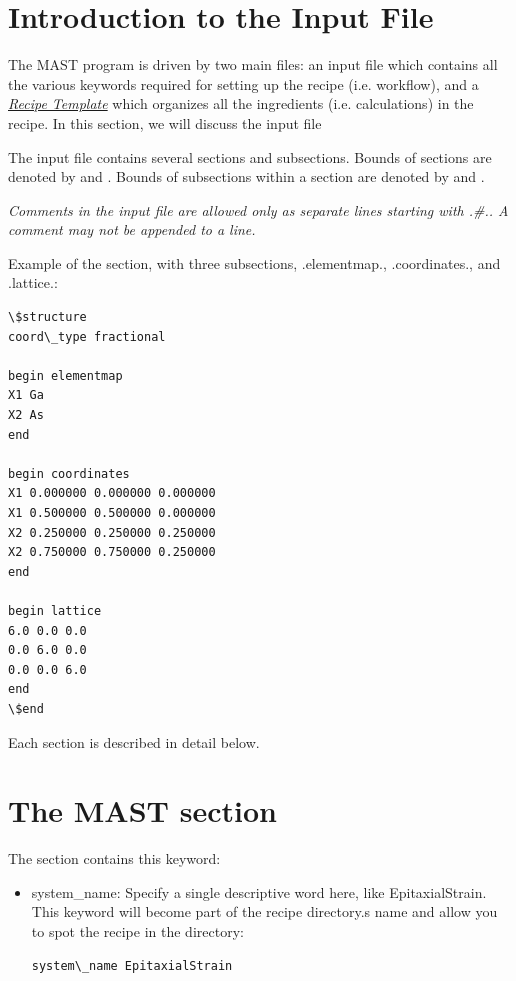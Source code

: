 \documentclass[letterpaper,10pt,english]{sphinxmanual}
\begin{document}
\section{Introduction to the Input File}
\label{3_0_inputfile:introduction-to-the-input-file}
The MAST program is driven by two main files: an input file which contains all the various keywords required for setting up the recipe (i.e. workflow), and a {\hyperref[4_0_recipe::doc]{\emph{Recipe Template}}} which organizes all the ingredients (i.e. calculations) in the recipe. In this section, we will discuss the input file

The input file contains several sections and subsections.
Bounds of sections are denoted by  and .
Bounds of subsections within a section are denoted by  and .

\emph{Comments in the input file are allowed only as separate lines starting with .\#.. A comment may not be appended to a line.}

Example of the  section, with three subsections, .elementmap., .coordinates., and .lattice.:

\begin{Verbatim}[commandchars=\\\{\}]
\$structure
coord\_type fractional

begin elementmap
X1 Ga
X2 As
end

begin coordinates
X1 0.000000 0.000000 0.000000
X1 0.500000 0.500000 0.000000
X2 0.250000 0.250000 0.250000
X2 0.750000 0.750000 0.250000
end

begin lattice
6.0 0.0 0.0
0.0 6.0 0.0
0.0 0.0 6.0
end
\$end
\end{Verbatim}

Each section is described in detail below.


\section{The MAST section}
\label{3_0_inputfile:the-mast-section}
The  section contains this keyword:
\begin{itemize}
\item {} 
system\_name: Specify a single descriptive word here, like EpitaxialStrain. This keyword will become part of the recipe directory.s name and allow you to spot the recipe in the  directory:

\begin{Verbatim}[commandchars=\\\{\}]
system\_name EpitaxialStrain
\end{Verbatim}

\end{itemize}
\end{document}
